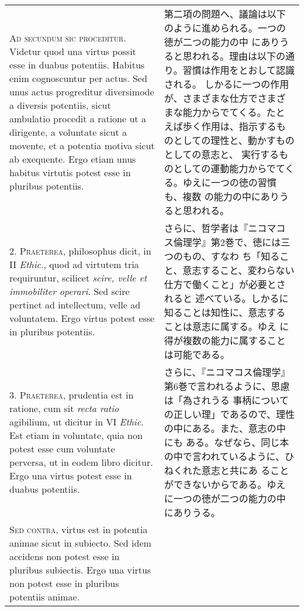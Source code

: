 \documentclass[10pt]{jsarticle}
\begin{document}
\begin{longtable}{p{21em}p{21em}}

{\scshape Ad secundum sic proceditur}. Videtur quod una virtus possit
esse in duabus potentiis. Habitus enim cognoscuntur per actus. Sed
unus actus progreditur diversimode a diversis potentiis, sicut
ambulatio procedit a ratione ut a dirigente, a voluntate sicut a
movente, et a potentia motiva sicut ab exequente. Ergo etiam unus
habitus virtutis potest esse in pluribus potentiis.

&

第二項の問題へ、議論は以下のように進められる。一つの徳が二つの能力の中
にありうると思われる。理由は以下の通り。習慣は作用をとおして認識される。
しかるに一つの作用が、さまざまな仕方でさまざまな能力からでてくる。たと
えば歩く作用は、指示するものとしての理性と、動かすものとしての意志と、
実行するものとしての運動能力からでてくる。ゆえに一つの徳の習慣も、複数
の能力の中にありうると思われる。

\\

2. {\scshape Praeterea}, philosophus dicit, in II {\itshape Ethic}.,
quod ad virtutem tria requiruntur, scilicet {\itshape scire, velle et
immobiliter operari}. Sed scire pertinet ad intellectum, velle ad
voluntatem. Ergo virtus potest esse in pluribus potentiis.

&

さらに、哲学者は『ニコマコス倫理学』第2巻で、徳には三つのもの、すなわ
ち「知ること、意志すること、変わらない仕方で働くこと」が必要とされると
述べている。しかるに知ることは知性に、意志することは意志に属する。ゆえ
に得が複数の能力に属することは可能である。

\\

3. {\scshape Praeterea}, prudentia est in ratione, cum sit {\itshape
recta ratio} agibilium, ut dicitur in VI {\itshape Ethic}. Est etiam
in voluntate, quia non potest esse cum voluntate perversa, ut in eodem
libro dicitur. Ergo una virtus potest esse in duabus potentiis.

&

さらに、『ニコマコス倫理学』第6巻で言われるように、思慮は「為されうる
事柄についての正しい理」であるので、理性の中にある。また、意志の中にも
ある。なぜなら、同じ本の中で言われているように、ひねくれた意志と共にあ
ることができないからである。ゆえに一つの徳が二つの能力の中にありうる。

\\

{\scshape Sed contra}, virtus est in potentia animae sicut in
subiecto. Sed idem accidens non potest esse in pluribus
subiectis. Ergo una virtus non potest esse in pluribus potentiis
animae.


\end{longtable}
\end{document}

